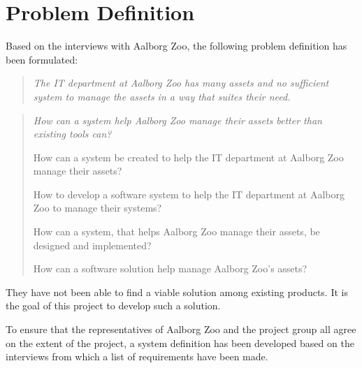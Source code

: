 \section{Problem Definition}
Based on the interviews with Aalborg Zoo, the following problem definition has been formulated:

\begin{quote}
    \textit{The IT department at Aalborg Zoo has many assets and no sufficient system to manage the assets in a way that suites their need.}
\end{quote}

\begin{quote}
    \textit{How can a system help Aalborg Zoo manage their assets better than existing tools can?}
    
    How can a system be created to help the IT department at Aalborg Zoo manage their assets?
    
    How to develop a software system to help the IT department at Aalborg Zoo to manage their systems?
    
    How can a system, that helps Aalborg Zoo manage their assets, be designed and implemented?
    
    How can a software solution help manage Aalborg Zoo's assets?
\end{quote}

They have not been able to find a viable solution among existing products. It is the goal of this project to develop such a solution.
\par
To ensure that the representatives of Aalborg Zoo and the project group all agree on the extent of the project, a system definition has been developed based on the interviews from which a list of requirements have been made.
